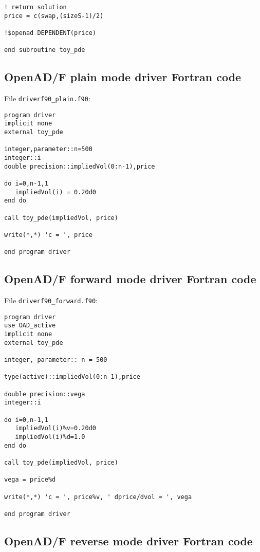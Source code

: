 \documentclass{amsart}
\theoremstyle{plain}
\numberwithin{equation}{section}
\begin{document}
\begin{appendix}
\begin{verbatim}
! return solution
price = c(swap,(sizeS-1)/2)

!$openad DEPENDENT(price)

end subroutine toy_pde
\end{verbatim}

\subsection{OpenAD/F plain mode driver Fortran code}

File \verb+driverf90_plain.f90+:

\begin{verbatim}
program driver
implicit none
external toy_pde

integer,parameter::n=500
integer::i
double precision::impliedVol(0:n-1),price

do i=0,n-1,1
   impliedVol(i) = 0.20d0
end do

call toy_pde(impliedVol, price)

write(*,*) 'c = ', price

end program driver
\end{verbatim}

\subsection{OpenAD/F forward mode driver Fortran code}

File \verb+driverf90_forward.f90+:

\begin{verbatim}
program driver
use OAD_active
implicit none
external toy_pde

integer, parameter:: n = 500

type(active)::impliedVol(0:n-1),price

double precision::vega
integer::i

do i=0,n-1,1
   impliedVol(i)%v=0.20d0
   impliedVol(i)%d=1.0
end do

call toy_pde(impliedVol, price)

vega = price%d

write(*,*) 'c = ', price%v, ' dprice/dvol = ', vega

end program driver
\end{verbatim}

\subsection{OpenAD/F reverse mode driver Fortran code}


\end{appendix}
\end{document}
